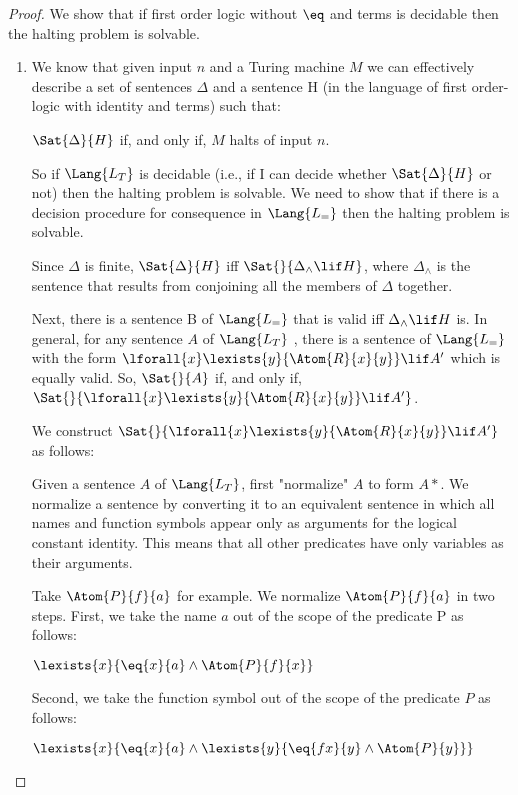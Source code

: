 \documentclass[../../include/open-logic-section]{subfiles}
\begin{document}

\begin{proof}
We show that if first order logic without $\eq$ and terms is decidable then
the halting problem is solvable.
\begin{enumerate}
\item We know that given input $n$ and a Turing machine $M$ we can
effectively describe a set of sentences $\Delta$ and a sentence H (in the
language of first order-logic with identity and terms) such that:

$\Sat{\Delta}{H}$ if, and only if, $M$ halts of input $n$.

So if $\Lang{L_T}$ is decidable (i.e., if I can decide whether
$\Sat{\Delta}{H}$ or not) then the halting problem is solvable. We need to
show that if there is a decision procedure for consequence in $\Lang{L_=}$
then the halting problem is solvable.

Since $\Delta$ is finite, $\Sat{\Delta}{H}$ iff $\Sat{}{\Delta_\land \lif
H}$, where $\Delta_\land$ is the sentence that results from conjoining all
the members of $\Delta$ together.

Next, there is a sentence B of $\Lang{L_=}$ that is valid iff $\Delta_\land
\lif H$ is. In general, for any sentence $A$ of $\Lang{L_T}$ , there is a
sentence of $\Lang{L_=}$ with the form
$\lforall{x}\lexists{y}{\Atom{R}{x}{y}}\lif A'$ which is equally valid. So,
$\Sat{}{A}$ if, and only if,
$\Sat{}{\lforall{x}\lexists{y}{\Atom{R}{x}{y}}\lif A'}$.

We construct $\Sat{}{\lforall{x}\lexists{y}{\Atom{R}{x}{y}}\lif A'}$ as
follows:

Given a sentence $A$ of $\Lang{L_T}$, first "normalize" $A$ to form $A*$.
We normalize a sentence by converting it to an equivalent sentence in which
all names and function symbols appear only as arguments for the logical
constant identity. This means that all other predicates have only variables
as their arguments.

Take $\Atom{P}{f}{a}$ for example. We normalize $\Atom{P}{f}{a}$ in two
steps. First, we take the name $a$ out of the scope of the predicate P as
follows:

$\lexists{x}{\eq{x}{a} \land \Atom{P}{f}{x}}$

Second, we take the function symbol out of the scope of the predicate $P$
as follows:

$\lexists{x}{\eq{x}{a} \land \lexists{y}{\eq{fx}{y} \land \Atom{P}{y}}}$


\end{enumerate}
\end{proof}
\end{document}
